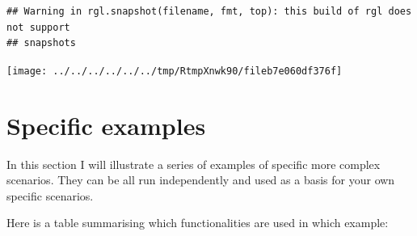 \documentclass[
]{book}
\begin{document}
\begin{verbatim}
## Warning in rgl.snapshot(filename, fmt, top): this build of rgl does not support
## snapshots
\end{verbatim}

\texttt{[image: ../../../../../../tmp/RtmpXnwk90/fileb7e060df376f]}

\hypertarget{specific-examples}{%
\chapter{Specific examples}\label{specific-examples}}

In this section I will illustrate a series of examples of specific more complex scenarios.
They can be all run independently and used as a basis for your own specific scenarios.

Here is a table summarising which functionalities are used in which example:
\end{document}
